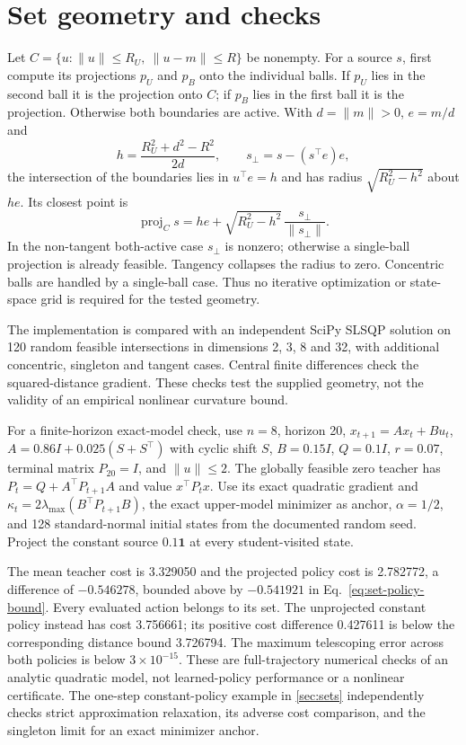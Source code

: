\section{Set geometry and checks}\label{app:set-geometry}
Let $C=\{u:\|u\|\leq R_U,\ \|u-m\|\leq R\}$ be nonempty. For a source $s$,
first compute its projections $p_U$ and $p_B$ onto the individual balls.
If $p_U$ lies in the second ball it is the projection onto $C$; if $p_B$
lies in the first ball it is the projection. Otherwise both boundaries
are active. With $d=\|m\|>0$, $e=m/d$ and
\begin{equation}
 h=\frac{R_U^2+d^2-R^2}{2d},\qquad
 s_\perp=s-(s^\top e)e,
\end{equation}
the intersection of the boundaries lies in $u^\top e=h$ and has radius
$\sqrt{R_U^2-h^2}$ about $he$. Its closest point is
\begin{equation}
 \operatorname{proj}_C s=he+\sqrt{R_U^2-h^2}\,
                       \frac{s_\perp}{\|s_\perp\|}.
\end{equation}
In the non-tangent both-active case $s_\perp$ is nonzero; otherwise a
single-ball projection is already feasible. Tangency collapses the radius
to zero. Concentric balls are handled by a single-ball case. Thus no
iterative optimization or state-space grid is required for the tested geometry.

The implementation is compared with an independent SciPy SLSQP solution on
120 random feasible intersections in dimensions 2, 3, 8 and 32, with
additional concentric, singleton and tangent cases. Central finite differences
check the squared-distance gradient. These checks test the supplied geometry,
not the validity of an empirical nonlinear curvature bound.

For a finite-horizon exact-model check, use $n=8$, horizon 20,
$x_{t+1}=Ax_t+Bu_t$, $A=0.86I+0.025(S+S^\top)$ with cyclic shift $S$,
$B=0.15I$, $Q=0.1I$, $r=0.07$, terminal matrix $P_{20}=I$, and
$\|u\|\leq2$. The globally feasible zero teacher has
$P_t=Q+A^\top P_{t+1}A$ and value $x^\top P_tx$. Use its exact quadratic
gradient and $\kappa_t=2\lambda_{\max}(B^\top P_{t+1}B)$, the exact
upper-model minimizer as anchor, $\alpha=1/2$, and 128 standard-normal
initial states from the documented random seed. Project the constant
source $0.1\mathbf1$ at every student-visited state.

The mean teacher cost is 3.329050 and the projected policy cost is 2.782772,
a difference of $-0.546278$, bounded above by $-0.541921$ in
Eq.~\eqref{eq:set-policy-bound}. Every evaluated action belongs to its set.
The unprojected constant policy instead has cost 3.756661; its positive
cost difference 0.427611 is below the corresponding distance bound 3.726794.
The maximum telescoping error across both policies is below
$3\times10^{-15}$. These are full-trajectory numerical checks of an analytic
quadratic model, not learned-policy performance or a nonlinear certificate.
The one-step constant-policy example in \ref{sec:sets} independently
checks strict approximation relaxation, its adverse cost comparison, and
the singleton limit for an exact minimizer anchor.
